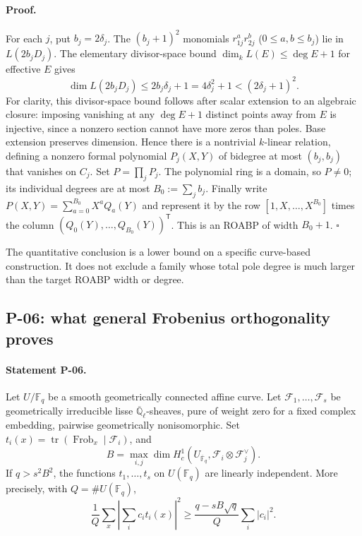 \paragraph{Proof.}
For each $j$, put $b_j=2\delta_j$. The $(b_j+1)^2$ monomials $r_{1j}^a r_{2j}^b$ ($0\le a,b\le b_j$) lie in $L(2b_jD_j)$. The elementary divisor-space bound $\dim_k L(E)\le\deg E+1$ for effective $E$ gives
\[
 \dim L(2b_jD_j)\le2b_j\delta_j+1=4\delta_j^2+1<(2\delta_j+1)^2.
\]
For clarity, this divisor-space bound follows after scalar extension to an algebraic closure: imposing vanishing at any $\deg E+1$ distinct points away from $E$ is injective, since a nonzero section cannot have more zeros than poles. Base extension preserves dimension. Hence there is a nontrivial $k$-linear relation, defining a nonzero formal polynomial $P_j(X,Y)$ of bidegree at most $(b_j,b_j)$ that vanishes on $C_j$. Set $P=\prod_jP_j$. The polynomial ring is a domain, so $P\ne0$; its individual degrees are at most $B_0:=\sum_jb_j$. Finally write $P(X,Y)=\sum_{a=0}^{B_0}X^a Q_a(Y)$ and represent it by the row $[1,X,\ldots,X^{B_0}]$ times the column $(Q_0(Y),\ldots,Q_{B_0}(Y))^{\mathsf T}$. This is an ROABP of width $B_0+1$. $\square$

The quantitative conclusion is a lower bound on a specific curve-based construction. It does not exclude a family whose total pole degree is much larger than the target ROABP width or degree.

\subsection{P-06: what general Frobenius orthogonality proves}
\paragraph{Statement P-06.}
Let $U/\mathbb F_q$ be a smooth geometrically connected affine curve. Let $\mathcal F_1,\ldots,\mathcal F_s$ be geometrically irreducible lisse $\overline{\mathbb Q}_\ell$-sheaves, pure of weight zero for a fixed complex embedding, pairwise geometrically nonisomorphic. Set $t_i(x)=\operatorname{tr}(\operatorname{Frob}_x\mid\mathcal F_i)$, and
\[
 B=\max_{i,j}\dim H_c^1(U_{\overline{\mathbb F}_q},\mathcal F_i\otimes\mathcal F_j^\vee).
\]
If $q>s^2B^2$, the functions $t_1,\ldots,t_s$ on $U(\mathbb F_q)$ are linearly independent. More precisely, with $Q=\#U(\mathbb F_q)$,
\[
 \frac1Q\sum_x\left|\sum_i c_it_i(x)\right|^2
 \ge\frac{q-sB\sqrt q}{Q}\sum_i|c_i|^2.
\]
